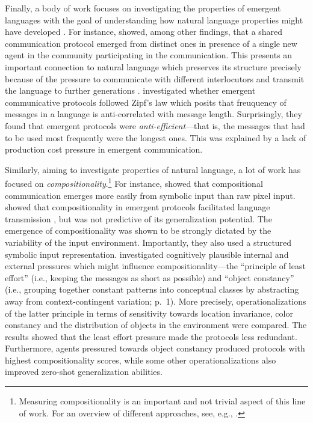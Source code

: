 Finally, a body of work focuses on investigating the properties of emergent languages with the goal of understanding how natural language properties might have developed \parencite{lazaridou2020emergent}. For instance, \cite{graesser2019emergent} showed, among other findings, that a shared communication protocol emerged from distinct ones in presence of a single new agent in the community participating in the communication. This presents an important connection to natural language which preserves its structure precisely because of the pressure to communicate with different interlocutors and transmit the language to further generations \parencite{tomasello2010origins, kirby2014iterated}. \cite{chaabouni2019anti} investigated whether emergent communicative protocols followed Zipf's law which posits that freuquency of messages in a language is anti-correlated with message length. Surprisingly, they found that emergent protocols were \textit{anti-efficient}---that is, the messages that had to be used most frequently were the longest ones. This was explained by a lack of production cost pressure in emergent communication.

Similarly, aiming to investigate properties of natural language, a lot of work has focused on \textit{compositionality}.\footnote{Measuring compositionality is an important and not trivial aspect of this line of work. For an overview of different approaches, see, e.g., \cite{lazaridou2020emergent}.} For instance, \cite{lazaridou2018emergence} showed that compositional communication emerges more easily from symbolic input than raw pixel input. 
\cite{chaabouni2020compositionality} showed that compositionality in emergent protocols facilitated language transmission \parencite[cf.][]{kirby2014iterated, lazaridou2020emergent}, but was not predictive of its generalization potential. The emergence of compositionality was shown to be strongly dictated by the variability of the input environment. Importantly, they also used a structured symbolic input representation.
\cite{luna2020internal} investigated cognitively plausible internal and external pressures which might influence compositionality---the ``principle of least effort'' (i.e., keeping the messages as short as possible) and ``object constancy'' (i.e., grouping together constant patterns into conceptual classes by abstracting away from context-contingent variation; p.~1). More precisely, operationalizations of the latter principle in terms of sensitivity towards location invariance, color constancy and the distribution of objects in the environment were compared. The results showed that the least effort pressure made the protocols less redundant. Furthermore, agents pressured towards object constancy produced protocols with highest compositionality scores, while some other operationalizations also improved zero-shot generalization abilities. 

